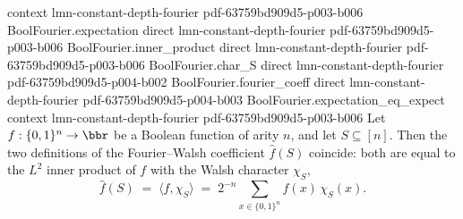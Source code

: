 \begin{lemma}
  {context}
  {lmn-constant-depth-fourier}
  {pdf-63759bd909d5-p003-b006}
\proofstep
  {BoolFourier.expectation}
  {direct}
  {lmn-constant-depth-fourier}
  {pdf-63759bd909d5-p003-b006}
\proofstep
  {BoolFourier.inner_product}
  {direct}
  {lmn-constant-depth-fourier}
  {pdf-63759bd909d5-p003-b006}
\proofstep
  {BoolFourier.char_S}
  {direct}
  {lmn-constant-depth-fourier}
  {pdf-63759bd909d5-p004-b002}
\proofstep
  {BoolFourier.fourier_coeff}
  {direct}
  {lmn-constant-depth-fourier}
  {pdf-63759bd909d5-p004-b003}
\proofstep
  {BoolFourier.expectation_eq_expect}
  {context}
  {lmn-constant-depth-fourier}
  {pdf-63759bd909d5-p003-b006}
Let $f : \{0,1\}^n \to \bbr$ be a Boolean function of arity $n$, and let $S \subseteq
[n]$. Then the two definitions of the Fourier–Walsh coefficient $\hat f(S)$ coincide:
both are equal to the $L^2$ inner product of $f$ with the Walsh character $\chi_S$,
\[
\hat f(S) \;=\; \langle f, \chi_S\rangle \;=\; 2^{-n}\sum_{x\in\{0,1\}^n}
f(x)\,\chi_S(x).
\]
\end{lemma}

